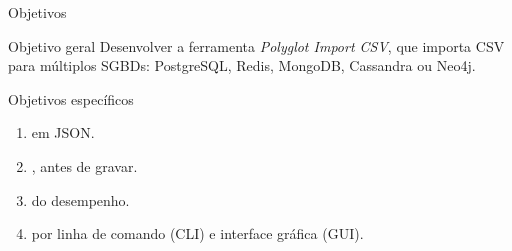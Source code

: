 \begin{frame}[label=objetivos]{Objetivos}
  \begin{painel}{Objetivo geral}{}
    Desenvolver a ferramenta \textit{Polyglot Import CSV}, que importa CSV para
    múltiplos SGBDs: PostgreSQL, Redis, MongoDB, Cassandra ou Neo4j.
  \end{painel}
  \smallskip
  \begin{painel}{Objetivos específicos}{}
    \begin{enumerate}
      \item {} em JSON.
      \item {}, antes de gravar.
      \item {} do desempenho.
      \item {} por linha de comando (CLI) e interface gráfica (GUI).
    \end{enumerate}
  \end{painel}
\end{frame}
